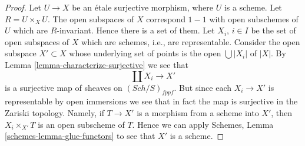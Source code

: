 \documentclass[10pt,a4paper]{amsart}
\theoremstyle{plain}
\theoremstyle{definition}
\theoremstyle{remark}
\numberwithin{equation}{subsection}
\def\Sch{\mathit{Sch}}
\begin{document}
\begin{proof}
Let $U \to X$ be an \'etale surjective morphism, where $U$ is a scheme.
Let $R = U \times_X U$. The open subspaces of $X$ correspond $1 - 1$
with open subschemes of $U$ which are $R$-invariant. Hence there is a
set of them. Let $X_i$, $i \in I$ be the set of open subspaces
of $X$ which are schemes, i.e., are representable. Consider the
open subspace $X' \subset X$ whose underlying set of points is
the open $\bigcup |X_i|$ of $|X|$. By
Lemma \ref{lemma-characterize-surjective}
we see that
$$
\coprod X_i \longrightarrow X'
$$
is a surjective map of sheaves on $(\Sch/S)_{fppf}$.
But since each $X_i \to X'$ is representable by open immersions
we see that in fact the map is surjective in the Zariski
topology. Namely, if $T \to X'$ is a morphism from a scheme
into $X'$, then $X_i \times_{X'} T$ is an open subscheme of $T$.
Hence we can apply
Schemes, Lemma \ref{schemes-lemma-glue-functors}
to see that $X'$ is a scheme.
\end{proof}
\end{document}
